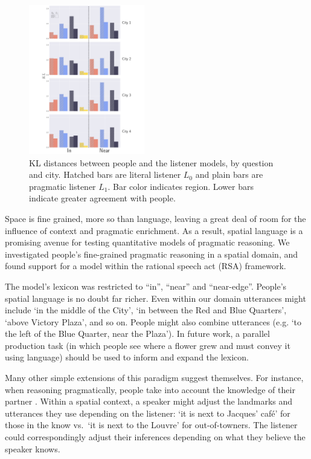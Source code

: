 \documentclass[10pt,letterpaper]{article}
\begin{document}
\begin{figure}[!b]
\center
\includegraphics[width=0.45\textwidth]{figures/KL.pdf}
\caption{KL distances between people and the listener models, by question and city. Hatched bars are literal listener $L_0$ and plain bars are  pragmatic listener $L_1$. Bar color indicates region. Lower bars indicate greater agreement with people.}
\label{fig:KL}
\end{figure}

Space is fine grained, more so than language, leaving a great deal of room for the influence of context and pragmatic enrichment. As a result, spatial language is a promising avenue for testing quantitative models of pragmatic reasoning. We investigated people's fine-grained pragmatic reasoning in a spatial domain, and found support for a model within the rational speech act (RSA) framework.  

The model's lexicon was restricted to ``in'', ``near'' and ``near-edge''. People's spatial language is no doubt far richer. Even within our domain utterances might include `in the middle of the City', `in between the Red and Blue Quarters', `above Victory Plaza', and so on. People might also combine utterances (e.g. `to the left of the Blue Quarter, near the Plaza'). In future work, a parallel production task (in which people see where a flower grew and must convey it using language) should be used to inform and expand the lexicon. 

Many other simple extensions of this paradigm suggest themselves. For instance, when reasoning pragmatically, people take into account the knowledge of their partner \cite{ndg+ast:topics2013}. Within a spatial context, a speaker might adjust the landmarks and utterances they use depending on the listener: `it is next to Jacques' caf\'{e}' for those in the know vs.~`it is next to the Louvre' for out-of-towners. The listener could correspondingly adjust their inferences depending on what they believe the speaker knows.
\end{document}
